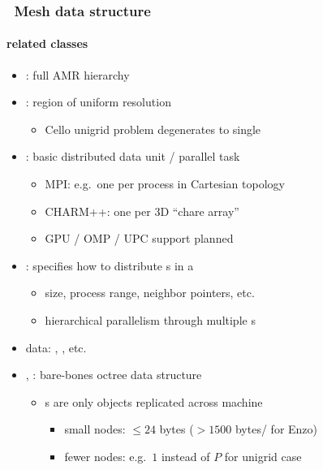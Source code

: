 \begin{frame}[fragile] 
\frametitle{\cello\ Mesh data structure}
\framesubtitle{ related classes}
\begin{itemize}
\small
\item {}: full AMR hierarchy
\item {}: region of uniform resolution
  \begin{itemize}
  \item Cello unigrid problem degenerates to single 
  \end{itemize}
\item {}: basic distributed data unit / parallel task
  \begin{itemize}
  \item MPI: e.g.~one  per process in Cartesian topology
  \item CHARM++: one  per 3D ``chare array''
  \item GPU / OMP / UPC support planned
  \end{itemize}
\item {}: specifies how to distribute s in a 
  \begin{itemize}
  \item {} size, process range, neighbor pointers, etc.
  \item hierarchical parallelism through multiple s
  \end{itemize}
\item {} data: , , etc.
\item {}, : bare-bones octree data structure
  \begin{itemize}
  \item {}s are only objects replicated across machine
    \begin{itemize}
    \item small nodes: $\le 24$ bytes ($>1500$ bytes/ for Enzo)
    \item fewer nodes: e.g.~$1$ instead of $P$ for unigrid case
    \end{itemize}
  \end{itemize}
\end{itemize}

\end{frame}





